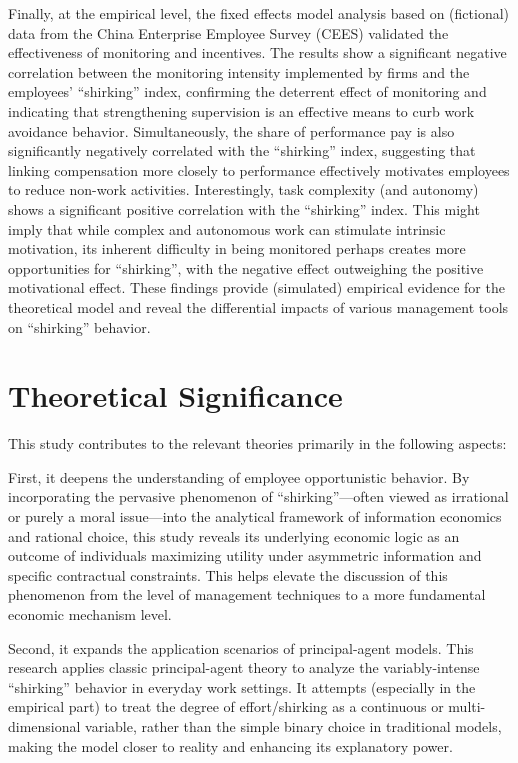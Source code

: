Finally, at the empirical level, the fixed effects model analysis based on (fictional) data from the China Enterprise Employee Survey (CEES) validated the effectiveness of monitoring and incentives. The results show a significant negative correlation between the monitoring intensity implemented by firms and the employees' \enquote{shirking} index, confirming the deterrent effect of monitoring and indicating that strengthening supervision is an effective means to curb work avoidance behavior. Simultaneously, the share of performance pay is also significantly negatively correlated with the \enquote{shirking} index, suggesting that linking compensation more closely to performance effectively motivates employees to reduce non-work activities. Interestingly, task complexity (and autonomy) shows a significant positive correlation with the \enquote{shirking} index. This might imply that while complex and autonomous work can stimulate intrinsic motivation, its inherent difficulty in being monitored perhaps creates more opportunities for \enquote{shirking}, with the negative effect outweighing the positive motivational effect. These findings provide (simulated) empirical evidence for the theoretical model and reveal the differential impacts of various management tools on \enquote{shirking} behavior.

\section{Theoretical Significance}

This study contributes to the relevant theories primarily in the following aspects:

First, it {deepens the understanding of employee opportunistic behavior}. By incorporating the pervasive phenomenon of \enquote{shirking}—often viewed as irrational or purely a moral issue—into the analytical framework of information economics and rational choice, this study reveals its underlying economic logic as an outcome of individuals maximizing utility under asymmetric information and specific contractual constraints. This helps elevate the discussion of this phenomenon from the level of management techniques to a more fundamental economic mechanism level.

Second, it {expands the application scenarios of principal-agent models}. This research applies classic principal-agent theory to analyze the variably-intense \enquote{shirking} behavior in everyday work settings. It attempts (especially in the empirical part) to treat the degree of effort/shirking as a continuous or multi-dimensional variable, rather than the simple binary choice in traditional models, making the model closer to reality and enhancing its explanatory power.

